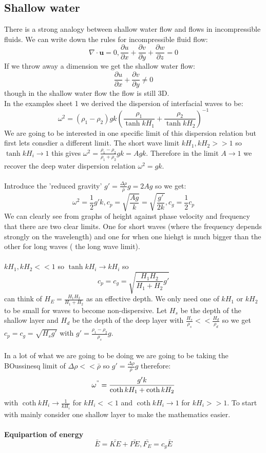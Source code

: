\documentclass{article}
\begin{document}
\subsection{Shallow water}
There is a strong analogy between shallow water flow and flows in incompressible fluids. We can write down the rules for incompressible fluid flow:
$$
\nabla \cdot \bm u = 0, \frac{\partial u}{\partial x} + \frac{\partial v}{\partial y} + \frac{\partial w}{\partial z} = 0
$$
If we throw away a dimension we get the shallow water flow:
$$
\frac{\partial u}{\partial x} + \frac{\partial v}{\partial y} \neq 0
$$
though in the shallow water flow the flow is still 3D.\\
In the examples sheet 1 we derived the dispersion of interfacial waves to be:
$$
\omega^2 = (\rho_1 - \rho_2) g k ( \frac{\rho_1}{\tanh kH_1} + \frac{\rho_2}{\tanh kH_2})^{-1}
$$
We are going to be interested in one specific limit of this dispersion relation but first lets consdier a different limit. The short wave limit $kH_1 , kH_2 >>1$ so $\tanh kH_i \rightarrow 1$ this gives $\omega^2 = \frac{\rho_1 - \rho_2}{\rho_1 + \rho_2} g k = A gk$. Therefore in the limit $ A \rightarrow 1$ we recover the deep water dispersion relation $\omega^2 = gk$.\\\\
Introduce the 'reduced gravity' $ g' = \frac{\Delta \rho}{\bar \rho} g = 2 A g$ so we get:
$$
\omega^2 = \frac{1}{2} g' k, c_p = \sqrt{ \frac{Ag}{k}} = \sqrt{ \frac{g'}{2k}}, c_g = \frac{1}{2} c_p
$$
We can clearly see from graphs of height against phase velocity and frequency that there are two clear limits. One for short waves (where the frequency depends strongly on the wavelength) and one for when one hiehgt is much bigger than the other for long waves ( the long wave limit).\\\\
$kH_1, kH_2 << 1$ so $\tanh kH_i \rightarrow kH_i$ so 
$$
c_p = c_g = \sqrt{ \frac{ H_1H_2}{H_1 + H_2} g'}
$$
can think of $H_E = \frac{H_1 H_2}{H_1 + H_2}$ as an effective depth. We only need one of $kH_1 $ or $kH_2$ to be small for waves to become non-dispersive. Let $H_s$ be the depth of the shallow layer and $H_d$ be the depth of the deep layer with $\frac{H_s}{\rho_s} << \frac{H_d}{\rho_d}$ so we get $c_p = c_g = \sqrt{ H_s g'}$ with $g' = \frac{\rho_1 - \rho_2}{\rho_s} g$. \\\\
In a lot of what we are going to be doing we are going to be taking the BOussinesq limit of $\Delta \rho << \bar \rho$ so $g' = \frac{\Delta \rho}{\bar \rho} g$ therefore:
$$
\omega^" = \frac{g' k}{\coth kH_1 + \coth k H_2} 
$$
with $\coth kH_i \rightarrow \frac{1}{kH_i}$ for $kH_i <<1$ and $\coth kH_i \rightarrow 1 $ for $kH_i>>1$. To start with mainly consider one shallow layer to make the mathematics easier.\\\\
\textbf{Equipartion of energy}
$$
\bar E = \bar{KE} + \bar{PE}, \bar{F_E} = c_g \bar E
$$
\end{document}
